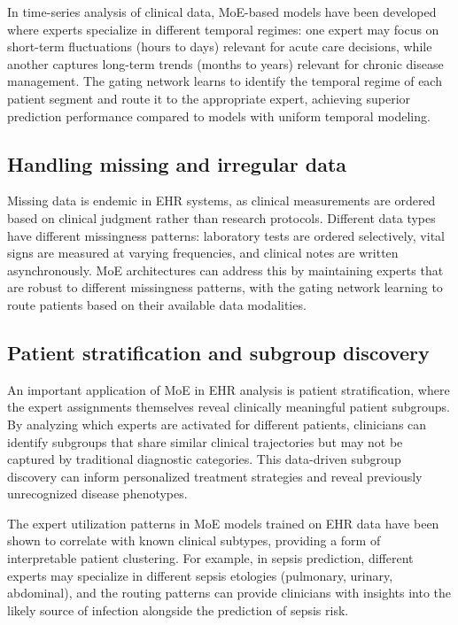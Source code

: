 In time-series analysis of clinical data, MoE-based models have been developed where experts specialize in different temporal regimes: one expert may focus on short-term fluctuations (hours to days) relevant for acute care decisions, while another captures long-term trends (months to years) relevant for chronic disease management. The gating network learns to identify the temporal regime of each patient segment and route it to the appropriate expert, achieving superior prediction performance compared to models with uniform temporal modeling.

\subsection*{Handling missing and irregular data}

Missing data is endemic in EHR systems, as clinical measurements are ordered based on clinical judgment rather than research protocols. Different data types have different missingness patterns: laboratory tests are ordered selectively, vital signs are measured at varying frequencies, and clinical notes are written asynchronously. MoE architectures can address this by maintaining experts that are robust to different missingness patterns, with the gating network learning to route patients based on their available data modalities.

\subsection*{Patient stratification and subgroup discovery}

An important application of MoE in EHR analysis is patient stratification, where the expert assignments themselves reveal clinically meaningful patient subgroups. By analyzing which experts are activated for different patients, clinicians can identify subgroups that share similar clinical trajectories but may not be captured by traditional diagnostic categories. This data-driven subgroup discovery can inform personalized treatment strategies and reveal previously unrecognized disease phenotypes.

The expert utilization patterns in MoE models trained on EHR data have been shown to correlate with known clinical subtypes, providing a form of interpretable patient clustering. For example, in sepsis prediction, different experts may specialize in different sepsis etologies (pulmonary, urinary, abdominal), and the routing patterns can provide clinicians with insights into the likely source of infection alongside the prediction of sepsis risk.
